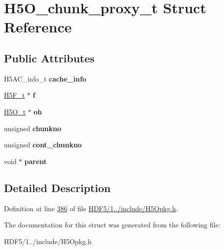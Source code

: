 \hypertarget{struct_h5_o__chunk__proxy__t}{}\section{H5\+O\+\_\+chunk\+\_\+proxy\+\_\+t Struct Reference}
\label{struct_h5_o__chunk__proxy__t}
\subsection*{Public Attributes}
\begin{DoxyCompactItemize}
\item 
\mbox{\label{struct_h5_o__chunk__proxy__t_a56ba3a41bd896dafa903b861cfad2eb2}} 
H5\+A\+C\+\_\+info\+\_\+t {\bfseries cache\+\_\+info}
\item 
\mbox{\label{struct_h5_o__chunk__proxy__t_a27d2dd094c5d0bbec8b980a6c313c944}} 
\hyperlink{struct_h5_f__t}{H5\+F\+\_\+t} $\ast$ {\bfseries f}
\item 
\mbox{\label{struct_h5_o__chunk__proxy__t_a24037138815a3c5d3b0d3246f7c9a18f}} 
\hyperlink{struct_h5_o__t}{H5\+O\+\_\+t} $\ast$ {\bfseries oh}
\item 
\mbox{\label{struct_h5_o__chunk__proxy__t_a44c4f20aac29bc7a9d3f2c57e7c4a62a}} 
unsigned {\bfseries chunkno}
\item 
\mbox{\label{struct_h5_o__chunk__proxy__t_a11965da2cbf7be4cd490a51a156398ec}} 
unsigned {\bfseries cont\+\_\+chunkno}
\item 
\mbox{\label{struct_h5_o__chunk__proxy__t_a57b3b805ffaaa8d49b16047b3def9b14}} 
void $\ast$ {\bfseries parent}
\end{DoxyCompactItemize}


\subsection{Detailed Description}


Definition at line \hyperlink{_h_d_f5_21_810_81_2include_2_h5_opkg_8h_source_l00386}{386} of file \hyperlink{_h_d_f5_21_810_81_2include_2_h5_opkg_8h_source}{H\+D\+F5/1../include/\+H5\+Opkg.\+h}.



The documentation for this struct was generated from the following file\+:\begin{DoxyCompactItemize}
\item 
H\+D\+F5/1../include/\+H5\+Opkg.\+h\end{DoxyCompactItemize}
